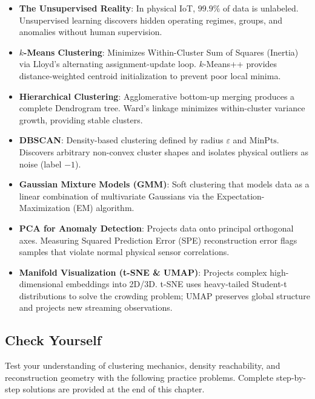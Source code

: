 \begin{takeaways}
\begin{itemize}
    \item \textbf{The Unsupervised Reality}: In physical IoT, $99.9\%$ of data is unlabeled. Unsupervised learning discovers hidden operating regimes, groups, and anomalies without human supervision.
    \item \textbf{$k$-Means Clustering}: Minimizes Within-Cluster Sum of Squares (Inertia) via Lloyd's alternating assignment-update loop. $k$-Means++ provides distance-weighted centroid initialization to prevent poor local minima.
    \item \textbf{Hierarchical Clustering}: Agglomerative bottom-up merging produces a complete Dendrogram tree. Ward's linkage minimizes within-cluster variance growth, providing stable clusters.
    \item \textbf{DBSCAN}: Density-based clustering defined by radius $\varepsilon$ and $\text{MinPts}$. Discovers arbitrary non-convex cluster shapes and isolates physical outliers as noise (label $-1$).
    \item \textbf{Gaussian Mixture Models (GMM)}: Soft clustering that models data as a linear combination of multivariate Gaussians via the Expectation-Maximization (EM) algorithm.
    \item \textbf{PCA for Anomaly Detection}: Projects data onto principal orthogonal axes. Measuring Squared Prediction Error (SPE) reconstruction error flags samples that violate normal physical sensor correlations.
    \item \textbf{Manifold Visualization (t-SNE \& UMAP)}: Projects complex high-dimensional embeddings into 2D/3D. t-SNE uses heavy-tailed Student-t distributions to solve the crowding problem; UMAP preserves global structure and projects new streaming observations.
\end{itemize}
\end{takeaways}

\subsection{Check Yourself}\label{subsec:unsupervised_check_yourself}

Test your understanding of clustering mechanics, density reachability, and reconstruction geometry with the following practice problems. Complete step-by-step solutions are provided at the end of this chapter.

